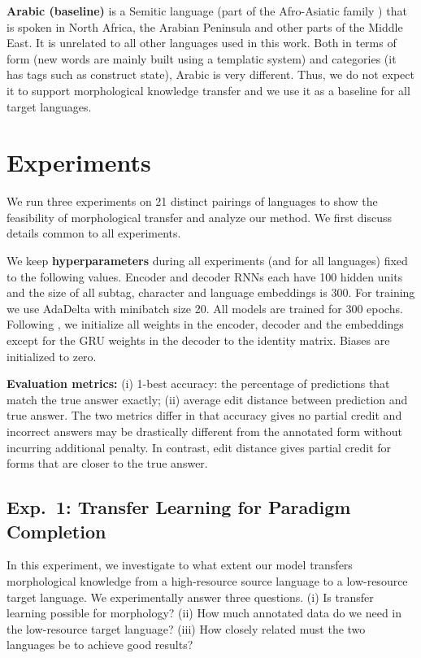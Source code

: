 \documentclass[11pt,letterpaper]{article}
\begin{document}
\textbf{Arabic (baseline)} is a Semitic language (part of the  Afro-Asiatic family
\cite{hetzron2013semitic}) that is
spoken in North Africa, the Arabian Peninsula and other parts of the
Middle East. It is unrelated to all other languages used in this work.
Both in terms of form (new words are mainly built using a templatic system) and categories (it has
tags such as construct state), Arabic is very different.
Thus, we do not expect it to support
morphological knowledge transfer and we use it as a baseline for
all target languages.



\section{Experiments}
We run three experiments on 21 distinct pairings of
languages to show the feasibility of morphological transfer and
analyze our method. We first discuss details common to
all experiments.


\label{subsection:technical_details}
We keep  \textbf{hyperparameters}
during all
experiments (and for all languages) fixed to the following values.
Encoder and decoder RNNs each have 100 hidden units and the size of all subtag, character and language 
embeddings  is 300. For training we use {\sc AdaDelta}
\cite{abs-1212-5701} with minibatch size 20.
All models are trained for 300 epochs.
Following , we initialize all weights in the
encoder, decoder and the embeddings except for the GRU weights in the
decoder to the identity matrix. Biases are initialized to zero.


\textbf{Evaluation metrics:}  (i) 1-best
accuracy: the percentage of predictions that match
the true answer exactly; (ii) average edit distance between
prediction and
true answer. 
The two metrics differ in that
accuracy gives no partial credit and incorrect answers may be
drastically different from the annotated form
without incurring additional penalty. In contrast, edit distance gives
partial credit for forms that are closer to the true answer.

\subsection{Exp.\ 1: Transfer Learning for Paradigm Completion}
\label{sec:experiment1}
In this experiment, we investigate to what extent our
model transfers morphological knowledge from a high-resource source language
to a low-resource target language.  
We experimentally answer three questions. (i) Is transfer learning possible for
morphology?  (ii) How much annotated data do we need in the
low-resource target language? (iii) How closely related must the
two languages be to achieve good results?
\end{document}
